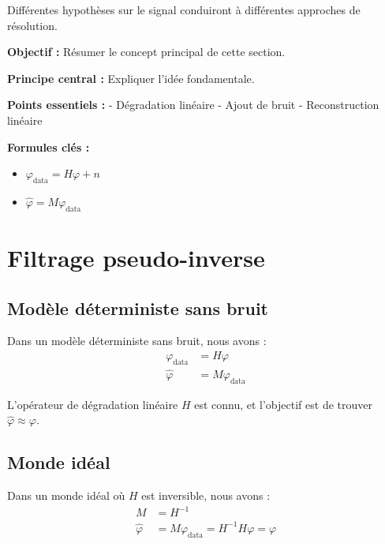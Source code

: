 \documentclass[12pt]{article}
\begin{document}
Différentes hypothèses sur le signal conduiront à différentes approches de résolution.

\begin{tcolorbox}[colback=red!5!white, colframe=red!75!black, title={\faBookmark\hspace{0.5em}Fiche Récapitulative}]
  
\textbf{Objectif :} Résumer le concept principal de cette section.
  
\textbf{Principe central :} Expliquer l'idée fondamentale.
  
\vspace{0.4em}
\textbf{Points essentiels :}  
- Dégradation linéaire
- Ajout de bruit
- Reconstruction linéaire
  
\vspace{0.4em}
\textbf{Formules clés :}  
\begin{itemize}
\item $\varphi_{\text{data}} = H\varphi + n$
\item $\hat{\varphi} = M\varphi_{\text{data}}$
\end{itemize}
  
\end{tcolorbox}

\section{Filtrage pseudo-inverse}

\subsection{Modèle déterministe sans bruit}

Dans un modèle déterministe sans bruit, nous avons :
\begin{align*}
\varphi_{\text{data}} &= H\varphi \\
\hat{\varphi} &= M\varphi_{\text{data}}
\end{align*}

L'opérateur de dégradation linéaire $H$ est connu, et l'objectif est de trouver $\hat{\varphi} \approx \varphi$.

\subsection{Monde idéal}

Dans un monde idéal où $H$ est inversible, nous avons :
\begin{align*}
M &= H^{-1} \\
\hat{\varphi} &= M\varphi_{\text{data}} = H^{-1}H\varphi = \varphi
\end{align*}
\end{document}
